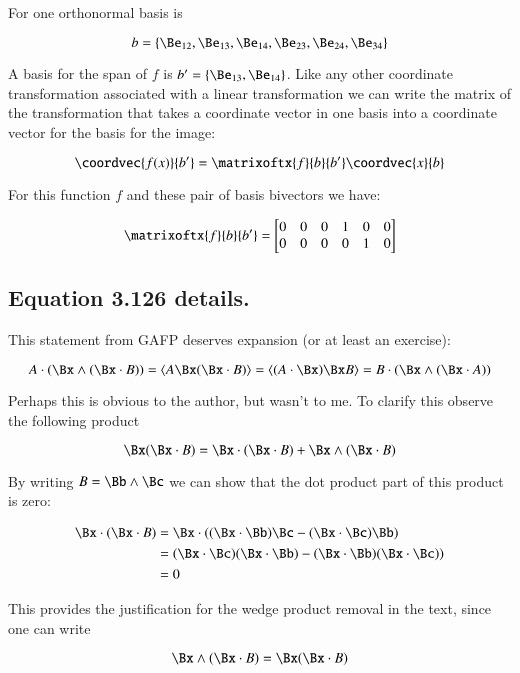 For  one orthonormal basis is

\[
b = \{ 
\Be_{12},
\Be_{13},
\Be_{14},
\Be_{23},
\Be_{24},
\Be_{34}
\}
\]

A basis for the span of $f$ is $b' = \{
\Be_{13},
\Be_{14}
\}$.  Like any other coordinate transformation associated with a linear transformation we can write the matrix of the transformation that
takes a coordinate vector in one basis into a coordinate vector for the basis for the image:

\[
\coordvec{f(x)}{b'}
=
\matrixoftx{f}{b}{b'}
\coordvec{x}{b}
\] 

For this function $f$ and these pair of basis bivectors we have:

\[
\matrixoftx{f}{b}{b'}
= 
\begin{bmatrix}
0 & 0 & 0 & 1 & 0 & 0 \\
0 & 0 & 0 & 0 & 1 & 0 \\
\end{bmatrix}
\]

\subsection{Equation 3.126 details. }

This statement from GAFP deserves expansion (or at least an exercise):

\[
A \cdot ( \Bx \wedge (\Bx \cdot B) )
= \langle{A \Bx (\Bx \cdot B)}\rangle
= \langle (A \cdot \Bx) \Bx B \rangle
= B \cdot ( \Bx \wedge (\Bx \cdot A) )
\]

Perhaps this is obvious to the author, but wasn't to me.  To clarify this observe the following product

\[
\Bx ( \Bx \cdot B ) = \Bx \cdot ( \Bx \cdot B ) + \Bx \wedge ( \Bx \cdot B ) 
\]

By writing $B = \Bb \wedge \Bc$ we can show that the dot product part of this product is zero:

\begin{align*}
\Bx \cdot ( \Bx \cdot B ) 
&= \Bx \cdot ( (\Bx \cdot \Bb) \Bc - (\Bx \cdot \Bc) \Bb ) \\
&= (\Bx \cdot \Bc) (\Bx \cdot \Bb) - (\Bx \cdot \Bb) (\Bx \cdot \Bc)) \\
&= 0
\end{align*}

This provides the justification for the wedge product removal in the text, since
one can write

\begin{equation}
\Bx \wedge ( \Bx \cdot B ) = \Bx ( \Bx \cdot B )
\end{equation}\label{eqn:itensor:inertiaWedgeToProduct}

